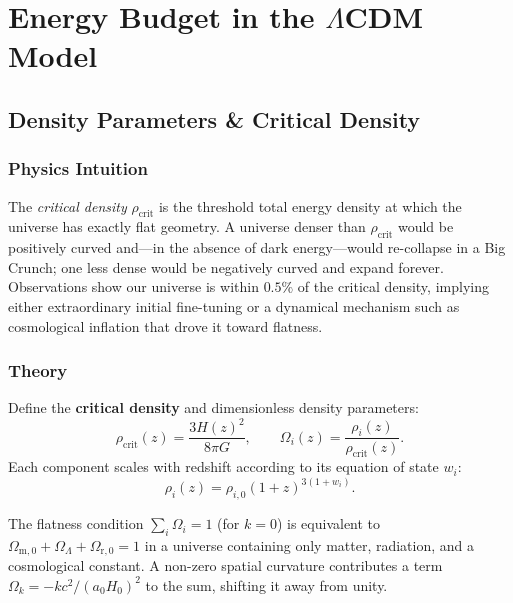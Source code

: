 
\chapter{Energy Budget in the $\Lambda$CDM Model}

\section{Density Parameters \& Critical Density}

\subsection{Physics Intuition}

\begin{intuition}
The \emph{critical density} $\rho_\mathrm{crit}$ is the threshold total energy density
at which the universe has exactly flat geometry.
A universe denser than $\rho_\mathrm{crit}$ would be positively curved
and—in the absence of dark energy—would re-collapse in a Big Crunch;
one less dense would be negatively curved and expand forever.
Observations show our universe is within $0.5\%$ of the critical density,
implying either extraordinary initial fine-tuning or a dynamical mechanism such as
cosmological inflation that drove it toward flatness.
\end{intuition}

\subsection{Theory}

\begin{theory}
Define the \textbf{critical density} and dimensionless density parameters:
\begin{equation}
  \rho_\mathrm{crit}(z) = \frac{3H(z)^2}{8\pi G}, \qquad
  \Omega_i(z) = \frac{\rho_i(z)}{\rho_{\mathrm{crit}}(z)}.
\end{equation}
Each component scales with redshift according to its equation of state $w_i$:
\begin{equation}
  \rho_i(z) = \rho_{i,0}(1+z)^{3(1+w_i)}.
\end{equation}

The flatness condition $\sum_i \Omega_i = 1$ (for $k=0$) is equivalent to
$\Omega_\mathrm{m,0} + \Omega_{\Lambda} + \Omega_\mathrm{r,0} = 1$ in a universe
containing only matter, radiation, and a cosmological constant.
A non-zero spatial curvature contributes a term
$\Omega_{k} = -kc^2/(a_0 H_0)^2$ to the sum, shifting it away from unity.
\end{theory}

